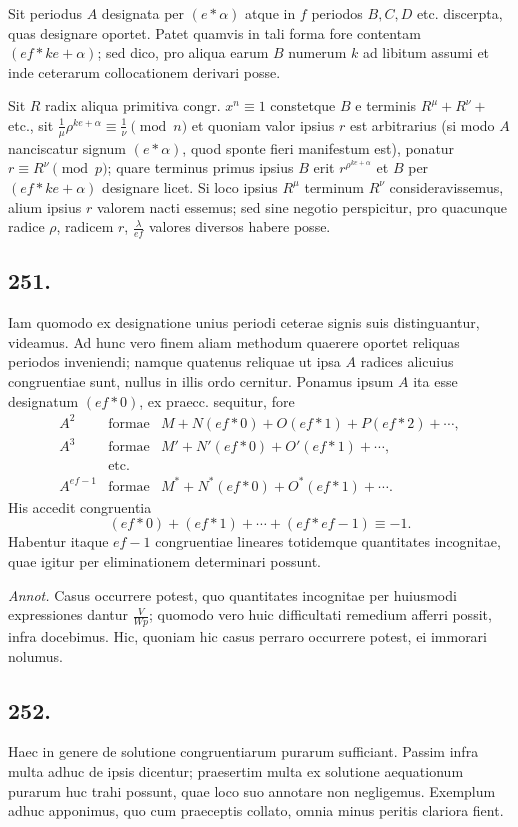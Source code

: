 \documentclass[12pt]{article}
\begin{document}
Sit periodus $A$ designata per $(e*\alpha)$ atque in $f$ periodos $B,C,D$ etc. discerpta, quas designare oportet. Patet quamvis in tali forma fore contentam $(ef*ke+\alpha)$; sed dico, pro aliqua earum $B$ numerum $k$ ad libitum assumi et inde ceterarum collocationem derivari posse.

Sit $R$ radix aliqua primitiva congr. $x^n\equiv 1$ constetque $B$ e terminis $R^\mu+R^\nu+$ etc., sit $\frac{1}{\mu}\rho^{ke+\alpha}\equiv \frac{1}{\nu}\pmod n$ et quoniam valor ipsius $r$ est arbitrarius (si modo $A$ nanciscatur signum $(e*\alpha)$, quod sponte fieri manifestum est), ponatur $r\equiv R^\nu\pmod p$; quare terminus primus ipsius $B$ erit $r^{\rho^{ke+\alpha}}$ et $B$ per $(ef*ke+\alpha)$ designare licet. Si loco ipsius $R^\mu$ terminum $R^\nu$ consideravissemus, alium ipsius $r$ valorem nacti essemus; sed sine negotio perspicitur, pro quacunque radice $\rho$, radicem $r$, $\frac{\lambda}{ef}$ valores diversos habere posse.

\subsection*{251.}
Iam quomodo ex designatione unius periodi ceterae signis suis distinguantur, videamus. Ad hunc vero finem aliam methodum quaerere oportet reliquas periodos inveniendi; namque quatenus reliquae ut ipsa $A$ radices alicuius congruentiae sunt, nullus in illis ordo cernitur. Ponamus ipsum $A$ ita esse designatum $(ef*0)$, ex praecc. sequitur, fore
\[
\begin{array}{rcl}
A^2&\text{formae}&M+N(ef*0)+O(ef*1)+P(ef*2)+\cdots,\\
A^3&\text{formae}&M'+N'(ef*0)+O'(ef*1)+\cdots,\\
&\text{etc.}&\\
A^{ef-1}&\text{formae}&M^*+N^*(ef*0)+O^*(ef*1)+\cdots.
\end{array}
\]
His accedit congruentia
\[
(ef*0)+(ef*1)+\cdots+(ef*ef-1)\equiv -1.
\]
Habentur itaque $ef-1$ congruentiae lineares totidemque quantitates incognitae, quae igitur per eliminationem determinari possunt.

\textit{Annot.} Casus occurrere potest, quo quantitates incognitae per huiusmodi expressiones dantur $\frac{V}{Wp}$; quomodo vero huic difficultati remedium afferri possit, infra docebimus. Hic, quoniam hic casus perraro occurrere potest, ei immorari nolumus.

\subsection*{252.}
Haec in genere de solutione congruentiarum purarum sufficiant. Passim infra multa adhuc de ipsis dicentur; praesertim multa ex solutione aequationum purarum huc trahi possunt, quae loco suo annotare non negligemus. Exemplum adhuc apponimus, quo cum praeceptis collato, omnia minus peritis clariora fient.
\end{document}
